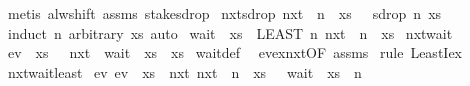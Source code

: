 \begin{isabellebody}
%
\isadelimproof
%
\endisadelimproof
%
\isatagproof
{}\isamarkupfalse%
\ {\isacharparenleft}metis\ alw{\isacharunderscore}shift\ assms\ stake{\isacharunderscore}sdrop{\isacharparenright}%
\endisatagproof
{\isafoldproof}%
%
\isadelimproof
\isanewline
%
\endisadelimproof
\isanewline
{}\isamarkupfalse%
\ nxt{\isacharunderscore}sdrop{\isacharcolon}\ {\isachardoublequoteopen}{\isacharparenleft}nxt\ {\isacharcircum}{\isacharcircum}\ n{\isacharparenright}\ {\isasymphi}\ xs\ {\isasymlongleftrightarrow}\ {\isasymphi}\ {\isacharparenleft}sdrop\ n\ xs{\isacharparenright}{\isachardoublequoteclose}\isanewline
%
\isadelimproof
%
\endisadelimproof
%
\isatagproof
{}\isamarkupfalse%
\ {\isacharparenleft}induct\ n\ arbitrary{\isacharcolon}\ xs{\isacharparenright}\ auto%
\endisatagproof
{\isafoldproof}%
%
\isadelimproof
\isanewline
%
\endisadelimproof
\isanewline
{}\isamarkupfalse%
\ {\isachardoublequoteopen}wait\ {\isasymphi}\ xs\ {\isasymequiv}\ LEAST\ n{\isachardot}\ {\isacharparenleft}nxt\ {\isacharcircum}{\isacharcircum}\ n{\isacharparenright}\ {\isasymphi}\ xs{\isachardoublequoteclose}\isanewline
\isanewline
{}\isamarkupfalse%
\ nxt{\isacharunderscore}wait{\isacharcolon}\isanewline
{}\ {\isachardoublequoteopen}ev\ {\isasymphi}\ xs{\isachardoublequoteclose}\ \ \ {\isachardoublequoteopen}{\isacharparenleft}nxt\ {\isacharcircum}{\isacharcircum}\ {\isacharparenleft}wait\ {\isasymphi}\ xs{\isacharparenright}{\isacharparenright}\ {\isasymphi}\ xs{\isachardoublequoteclose}\isanewline
%
\isadelimproof
%
\endisadelimproof
%
\isatagproof
{}\isamarkupfalse%
\ wait{\isacharunderscore}def\ \isamarkupfalse%
\ ev{\isacharunderscore}ex{\isacharunderscore}nxt{\isacharbrackleft}OF\ assms{\isacharbrackright}\ \isamarkupfalse%
{\isacharparenleft}rule\ LeastI{\isacharunderscore}ex{\isacharparenright}%
\endisatagproof
{\isafoldproof}%
%
\isadelimproof
\isanewline
%
\endisadelimproof
\isanewline
{}\isamarkupfalse%
\ nxt{\isacharunderscore}wait{\isacharunderscore}least{\isacharcolon}\isanewline
{}\ ev{\isacharcolon}\ {\isachardoublequoteopen}ev\ {\isasymphi}\ xs{\isachardoublequoteclose}\ \ nxt{\isacharcolon}\ {\isachardoublequoteopen}{\isacharparenleft}nxt\ {\isacharcircum}{\isacharcircum}\ n{\isacharparenright}\ {\isasymphi}\ xs{\isachardoublequoteclose}\ \ \ {\isachardoublequoteopen}wait\ {\isasymphi}\ xs\ {\isasymle}\ n{\isachardoublequoteclose}\isanewline

\end{isabellebody}
